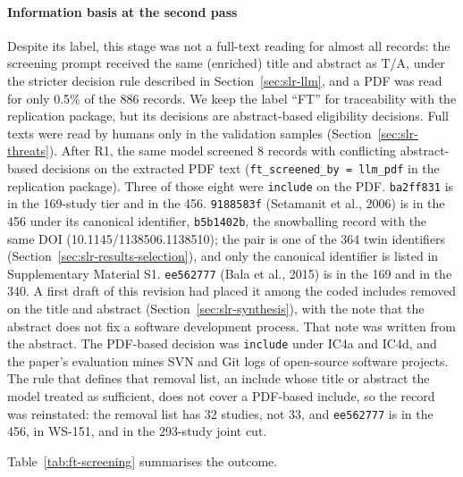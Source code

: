 \paragraph{Information basis at the second pass} Despite its label, this
stage was not a full-text reading for almost all records: the screening
prompt received the same (enriched) title and abstract as T/A, under the
stricter decision rule described in Section~\ref{sec:slr-llm}, and a PDF was
read for only 0.5\% of the 886 records. We keep the label ``FT'' for
traceability with the replication package, but its decisions are
abstract-based eligibility decisions. Full texts were read by humans only in
the validation samples (Section~\ref{sec:slr-threats}). After R1, the same
model screened 8 records with conflicting abstract-based decisions on the
extracted PDF text (\texttt{ft\_screened\_by = llm\_pdf} in the replication
package). Three of those eight were \texttt{include} on the PDF.
\texttt{ba2ff831} is in the 169-study tier and in the 456.
\texttt{9188583f} (Setamanit et al., 2006) is in the 456 under its
canonical identifier, \texttt{b5b1402b}, the snowballing record with the
same DOI (10.1145/1138506.1138510); the pair is one of the 364 twin
identifiers (Section~\ref{sec:slr-results-selection}), and only the
canonical identifier is listed in Supplementary Material S1.
\texttt{ee562777} (Bala et al., 2015) is in the 169 and in the 340. A
first draft of this revision had placed it among the coded includes
removed on the title and abstract (Section~\ref{sec:slr-synthesis}), with
the note that the abstract does not fix a software development process.
That note was written from the abstract. The PDF-based decision was
\texttt{include} under IC4a and IC4d, and the paper's evaluation mines
SVN and Git logs of open-source software projects. The rule that defines
that removal list, an include whose title or abstract the model treated
as sufficient, does not cover a PDF-based include, so the record was
reinstated: the removal list has 32 studies, not 33, and \texttt{ee562777}
is in the 456, in WS-151, and in the 293-study joint cut.

Table~\ref{tab:ft-screening} summarises the outcome.

